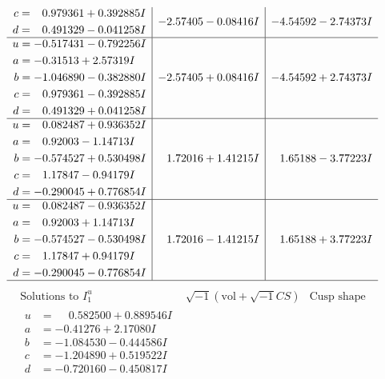 \documentclass[1p]{elsarticle_modified}
\theoremstyle{definition}
\newcommand{\I}{\sqrt{-1}}
\begin{document}
$$\begin{array}{c|c|c}
\begin{aligned}
c &= \phantom{-}0.979361 + 0.392885 I \\
d &= \phantom{-}0.491329 - 0.041258 I\end{aligned}
 & -2.57405 - 0.08416 I & -4.54592 - 2.74373 I \\ \hline\begin{aligned}
u &= -0.517431 - 0.792256 I \\
a &= -0.31513 + 2.57319 I \\
b &= -1.046890 - 0.382880 I \\
c &= \phantom{-}0.979361 - 0.392885 I \\
d &= \phantom{-}0.491329 + 0.041258 I\end{aligned}
 & -2.57405 + 0.08416 I & -4.54592 + 2.74373 I \\ \hline\begin{aligned}
u &= \phantom{-}0.082487 + 0.936352 I \\
a &= \phantom{-}0.92003 - 1.14713 I \\
b &= -0.574527 + 0.530498 I \\
c &= \phantom{-}1.17847 - 0.94179 I \\
d &= -0.290045 + 0.776854 I\end{aligned}
 & \phantom{-}1.72016 + 1.41215 I & \phantom{-}1.65188 - 3.77223 I \\ \hline\begin{aligned}
u &= \phantom{-}0.082487 - 0.936352 I \\
a &= \phantom{-}0.92003 + 1.14713 I \\
b &= -0.574527 - 0.530498 I \\
c &= \phantom{-}1.17847 + 0.94179 I \\
d &= -0.290045 - 0.776854 I\end{aligned}
 & \phantom{-}1.72016 - 1.41215 I & \phantom{-}1.65188 + 3.77223 I\\
 \hline 
 \end{array}$$\newpage$$\begin{array}{c|c|c}  
\text{Solutions to }I^u_{1}& \I (\text{vol} + \sqrt{-1}CS) & \text{Cusp shape}\\
 \hline 
\begin{aligned}
u &= \phantom{-}0.582500 + 0.889546 I \\
a &= -0.41276 + 2.17080 I \\
b &= -1.084530 - 0.444586 I \\
c &= -1.204890 + 0.519522 I \\
d &= -0.720160 - 0.450817 I\end{aligned}

\end{array}$$
\end{document}
